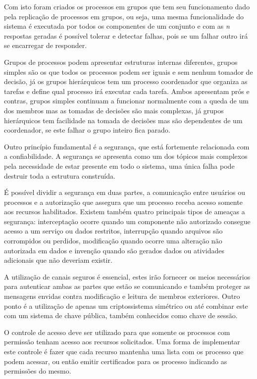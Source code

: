 	Com isto foram criados os processos em grupos que tem seu funcionamento dado pela replicação de processos em grupos, ou seja, uma mesma funcionalidade do sistema é executada por todos os componentes de um conjunto e com as \textit{n} respostas geradas é possível tolerar e detectar falhas, pois se um falhar outro irá se encarregar de responder.
	
	Grupos de processos podem apresentar estruturas internas diferentes, grupos simples são os que todos os processos podem ser iguais e sem nenhum tomador de decisão, já os grupos hierárquicos tem um processo coordenador que organiza as tarefas e define qual processo irá executar cada tarefa. Ambos apresentam prós e contras, grupos simples continuam a funcionar normalmente com a queda de um dos membros mas as tomadas de decisões são mais complexas, já grupos hierárquicos tem facilidade na tomada de decisões mas são dependentes de um coordenador, se este falhar o grupo inteiro fica parado.
	
	Outro princípio fundamental é a segurança, que está fortemente relacionada com a confiabilidade. A segurança se apresenta como um dos tópicos mais complexos pela necessidade de estar presente em todo o sistema, uma única falha pode destruir toda a estrutura construída.
	
	É possível dividir a segurança em duas partes, a comunicação entre usuários ou processos e a autorização que assegura que um processo receba acesso somente aos recursos habilitados. Existem também quatro principais tipos de ameaças a segurança: interceptação ocorre quando um componente não autorizado consegue acesso a um serviço ou dados restritos, interrupção quando arquivos são corrompidos ou perdidos, modificação quando ocorre uma alteração não autorizada em dados e invenção quando são gerados dados  ou atividades adicionais que não deveriam existir.
	
	A utilização de canais seguros é essencial, estes irão fornecer os meios necessários para autenticar ambas as partes que estão se comunicando e também proteger as mensagens envidas contra modificação e leitura de membros exteriores. Outro ponto é a utilização de apenas um criptossistema simétrico ou até combinar este com um sistema de chave pública, também conhecidos como chave de sessão.
	
	O controle de acesso deve ser utilizado para que somente os processos com permissão tenham acesso aos recursos solicitados. Uma forma de implementar este controle é fazer que cada recurso mantenha uma lista com os processo que podem acessar, ou então emitir certificados para os processo indicando as permissões do mesmo.
	
